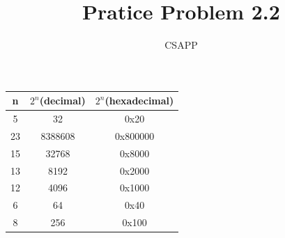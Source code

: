\documentclass{article}
\title{Pratice Problem 2.2}
\author{CSAPP}
\begin{document}
    \maketitle
    \vspace{1.0em}
    \begin{center}
        \begin{tabular}{ccc}
        \toprule
        n & $2^n$(decimal) & $2^n$(hexadecimal)\\
        \midrule
        5  & 32      & 0x20\\
        23 & 8388608 & 0x800000\\
        15 & 32768   & 0x8000\\
        13 & 8192    & 0x2000\\
        12 & 4096    & 0x1000\\
        6  & 64      & 0x40\\
        8  & 256     & 0x100\\
    \end{tabular}
    \end{center}
\end{document}
